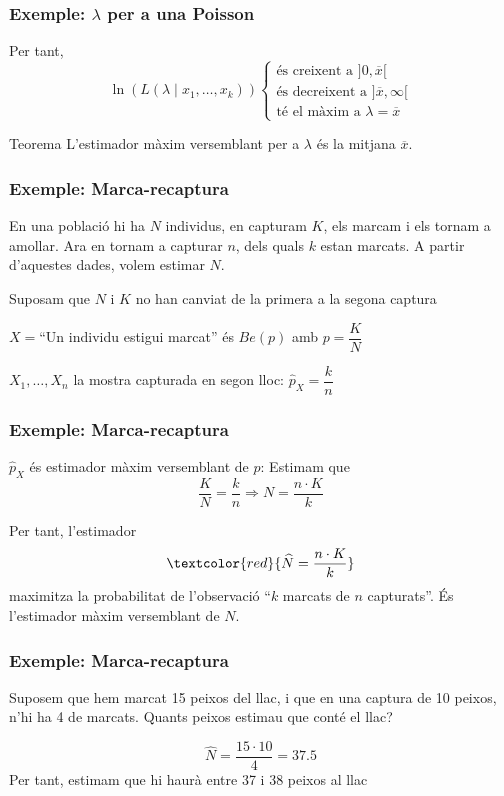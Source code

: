 \documentclass[12pt,t]{beamer}
\newcommand{\red}[1]{\textcolor{red}{#1}}
\renewcommand{\emph}[1]{{\color{red}#1}}
\theoremstyle{plain}
\theoremstyle{definition}
\begin{document}
\begin{frame}
\frametitle{Exemple: $\lambda$ per a una Poisson}
Per tant,
$$
\ln(L(\lambda\mid x_1,\ldots,x_k))\left\{\begin{array}{l}
\mbox{és creixent a $]0,\overline{x}[$}\\[1ex]
\mbox{és decreixent a $]\overline{x},\infty[$}\\[1ex]
\mbox{té el màxim a $\lambda=\overline{x}$}
\end{array}\right.
$$
\begin{block}{Teorema}
L'estimador màxim versemblant per a $\lambda$ és la mitjana  $\overline{x}$.
\end{block}
\end{frame}

\begin{frame}
\frametitle{Exemple: Marca-recaptura}

En una població hi ha $N$ individus, en capturam $K$, els marcam i els tornam a amollar.  Ara en tornam a capturar $n$, dels quals $k$ estan marcats. A partir d'aquestes dades, volem estimar $N$.
\bigskip

Suposam que $N$ i $K$ no han canviat de la primera a la segona captura
\bigskip

$X=$``Un individu estigui marcat'' és $Be(p)$ amb $p=\dfrac{K}{N}$
\bigskip

$X_1,\ldots,X_n$ la mostra capturada en segon lloc: $\widehat{p}_X=\dfrac{k}{n}$

\end{frame}


\begin{frame}
\frametitle{Exemple: Marca-recaptura}

$\widehat{p}_X$ és estimador màxim versemblant de $p$: Estimam que
$$
\dfrac{K}{N}=\dfrac{k}{n}\Rightarrow N=\frac{n\cdot K}{k}
$$

Per tant, l'estimador
$$
\red{\widehat{N}=\frac{n\cdot K}{k}}
$$
 maximitza la probabilitat de l'observació ``$k$ marcats de $n$ capturats''. És l'\emph{estimador màxim versemblant} de $N$.

\end{frame}

\begin{frame}
\frametitle{Exemple: Marca-recaptura}

Suposem que hem marcat 15 peixos del llac, i que en una captura de 10 peixos, n'hi ha 4 de marcats. Quants peixos estimau que conté el llac?
\medskip

$$
\widehat{N}=\frac{15\cdot 10}{4}=37.5
$$
Per tant, estimam que hi haurà entre 37 i 38 peixos al llac

\end{frame}
\end{document}
